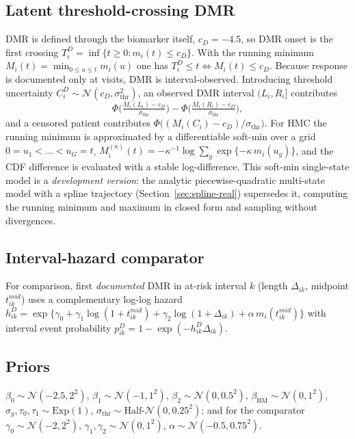 \documentclass[11pt]{article}
\newcommand{\Normal}{\mathcal{N}}
\begin{document}
\subsection{Latent threshold-crossing DMR}
DMR is defined through the biomarker itself, $c_D=-4.5$, so DMR onset is the
first crossing $T_i^{D}=\inf\{t\ge0:m_i(t)\le c_D\}$. With the running minimum
$M_i(t)=\min_{0\le u\le t}m_i(u)$ one has $T_i^{D}\le t\Leftrightarrow
M_i(t)\le c_D$. Because response is documented only at visits, DMR is
interval-observed. Introducing threshold uncertainty $C_i^{D}\sim
\Normal(c_D,\sigma_{\mathrm{thr}}^2)$, an observed DMR interval $(L_i,R_i]$
contributes
\begin{equation}
\Phi\!\Big(\tfrac{M_i(L_i)-c_D}{\sigma_{\mathrm{thr}}}\Big)
-\Phi\!\Big(\tfrac{M_i(R_i)-c_D}{\sigma_{\mathrm{thr}}}\Big),
\end{equation}
and a censored patient contributes $\Phi\!\big((M_i(C_i)-c_D)/
\sigma_{\mathrm{thr}}\big)$. For HMC the running minimum is approximated by a
differentiable soft-min over a grid $0=u_1<\dots<u_G=t$,
$M_i^{(\kappa)}(t)=-\kappa^{-1}\log\sum_{g}\exp\{-\kappa\, m_i(u_g)\}$, and the
CDF difference is evaluated with a stable log-difference. This soft-min
single-state model is a \emph{development version}: the analytic
piecewise-quadratic multi-state model with a spline trajectory
(Section~\ref{sec:spline-real}) supersedes it, computing the running minimum and
maximum in closed form and sampling without divergences.

\subsection{Interval-hazard comparator}
For comparison, first \emph{documented} DMR in at-risk interval $k$
(length $\Delta_{ik}$, midpoint $t^{mid}_{ik}$) uses a complementary log-log
hazard $h^{D}_{ik}=\exp\{\gamma_0+\gamma_1\log(1+t^{mid}_{ik})+\gamma_2
\log(1+\Delta_{ik})+\alpha\,m_i(t^{mid}_{ik})\}$ with interval event
probability $p^{D}_{ik}=1-\exp(-h^{D}_{ik}\Delta_{ik})$.

\subsection{Priors}
$\beta_0\sim\Normal(-2.5,2^2)$, $\beta_1\sim\Normal(-1,1^2)$,
$\beta_2\sim\Normal(0,0.5^2)$, $\beta_{\mathrm{BM}}\sim\Normal(0,1^2)$,
$\sigma_y,\tau_0,\tau_1\sim\mathrm{Exp}(1)$,
$\sigma_{\mathrm{thr}}\sim\text{Half-}\Normal(0,0.25^2)$; and for the
comparator $\gamma_0\sim\Normal(-2,2^2)$, $\gamma_1,\gamma_2\sim\Normal(0,1^2)$,
$\alpha\sim\Normal(-0.5,0.75^2)$.
\end{document}
